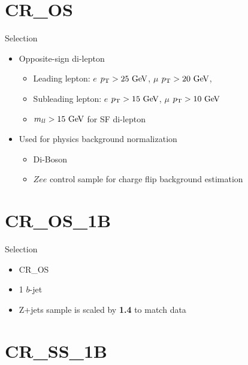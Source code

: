\documentclass[mathserif,serif]{beamer}
\begin{document}
\section{CR\_OS}
\begin{frame}
\sectionpage
\end{frame}

\begin{frame}{Selection}
\begin{itemize}
\item Opposite-sign di-lepton
\begin{itemize}
\item Leading lepton: $e$ $\pt>25\GeV$, $\mu$ $\pt>20\GeV$,
\item Subleading lepton: $e$ $\pt>15\GeV$, $\mu$ $\pt>10\GeV$
\item $m_{ll}>15\GeV$ for SF di-lepton
\end{itemize}
\item Used for physics background normalization
\begin{itemize}
\item Di-Boson
\item $Zee$ control sample for charge flip background estimation
\end{itemize}
\end{itemize}
\end{frame}

%
%

\section{CR\_OS\_1B}
\begin{frame}
\sectionpage
\end{frame}

\begin{frame}{Selection}
\begin{itemize}
\item CR\_OS
\item 1 $b$-jet
\item Z+jets sample is scaled by {\bf 1.4} to match data
\end{itemize}
\end{frame}

%
%

\section{CR\_SS\_1B}
\begin{frame}
\sectionpage
\end{frame}
\end{document}
